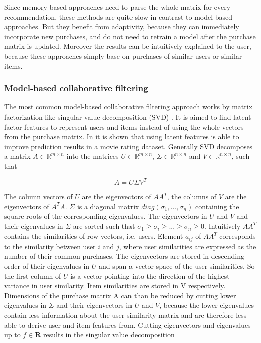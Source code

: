 \documentclass[10pt]{reportMaster}
\begin{document}
Since memory-based approaches need to parse the whole matrix for every recommendation, these methods are quite slow in contrast to model-based approaches.
But they benefit from adaptivity, because they can immediately incorporate new purchases, and do not need to retrain a model after the purchase matrix is updated.
Moreover the results can be intuitively explained to the user, because these approaches simply base on purchases of similar users or similar items.


\subsubsection{Model-based collaborative filtering}
\label{sec:modelBasedCF}
The most common model-based collaborative filtering approach works by matrix factorization like singular value decomposition (SVD) \cite{svdGolubGeneral}.
It is aimed to find latent factor features to represent users and items instead of using the whole vectors from the purchase matrix.
In \cite{SVDNeuralNet} it is shown that using latent features is able to improve prediction results in a movie rating dataset.
Generally SVD decomposes a matrix $A \in \mathds{R}^{m \times n}$ into the matrices $U \in \mathds{R}^{m \times n}$, $\Sigma \in \mathds{R}^{n \times n}$ and $V \in \mathds{R}^{n \times n}$, such that 

\begin{equation}
	A = U \Sigma V^T
\end{equation}

The column vectors of $U$ are the eigenvectors of $AA^T$, the columns of $V$ are the eigenvectors of $A^TA$.
$\Sigma$ is a diagonal matrix $diag(\sigma_1, ..., \sigma_n)$ containing the square roots of the corresponding eigenvalues.  %
The eigenvectors in $U$ and $V$ and their eigenvalues in $\Sigma$ are sorted such that $\sigma_1 \geq \sigma_i \geq ... \geq \sigma_n \geq 0$.
Intuitively $AA^T$ contains the similarities of row vectors, i.e. users.
Element $a_{ij}$ of $AA^T$ corresponds to the similarity between user $i$ and $j$, where user similarities are expressed as the number of their common purchases.
The eigenvectors are stored in descending order of their eigenvalues in $U$ and span a vector space of the user similarities.
So the first column of $U$ is a vector pointing into the direction of the highest variance in user similarity. 
Item similarities are stored in V respectively.
Dimensions of the purchase matrix A can than be reduced by cutting lower eigenvalues in $\Sigma$ and their eigenvectors in $U$ and $V$, because the lower eigenvalues contain less information about the user similarity matrix and are therefore less able to derive user and item features from.
Cutting eigenvectors and eigenvalues up to $f \in \mathbf{R}$ results in the singular value decomposition 
\end{document}
